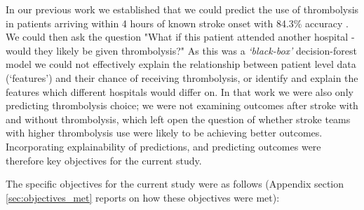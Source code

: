 
In our previous work we established that we could predict the use of thrombolysis in patients arriving within 4 hours of known stroke onset with 84.3\% accuracy \cite{allen_use_2022}. We could then ask the question "What if this patient attended another hospital - would they likely be given thrombolysis?" As this was a \emph{`black-box'} decision-forest model we could not effectively explain the relationship between patient level data (`features') and their chance of receiving thrombolysis, or identify and explain the features which different hospitals would differ on. In that work we were also only predicting thrombolysis choice; we were not examining outcomes after stroke with and without thrombolysis, which left open the question of whether stroke teams with higher thrombolysis use were likely to be achieving better outcomes. Incorporating explainability of predictions, and predicting outcomes were therefore key objectives for the current study.

The specific objectives for the current study were as follows (Appendix section \ref{sec:objectives_met} reports on how these objectives were met):

